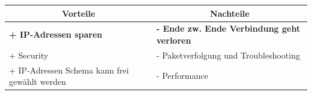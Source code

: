 \begin{table}[H]
	\begin{tabular}{l|l}
		\multicolumn{1}{c}{Vorteile} & \multicolumn{1}{c}{Nachteile} \\
		\hline
		\textbf{+ IP-Adressen sparen} & \textbf{- Ende zw. Ende Verbindung geht verloren} \\
		+ Security & - Paketverfolgung und Troubleshooting \\
		+ IP-Adressen Schema kann frei gewählt werden & - Performance \\
	\end{tabular}
\end{table}

